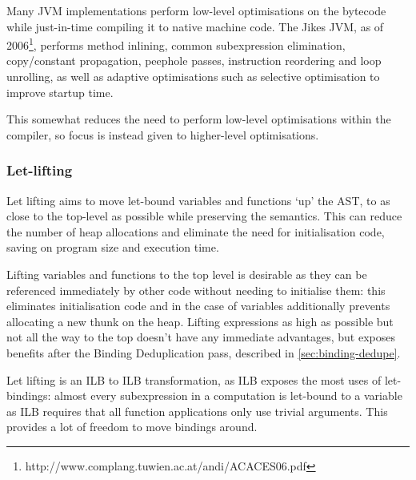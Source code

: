 \documentclass[dissertation.tex]{subfiles}
\begin{document}
{{        Many JVM implementations perform low-level optimisations on the bytecode while just-in-time compiling it to
        native machine code. The Jikes JVM, as of 2006\footnote{http://www.complang.tuwien.ac.at/andi/ACACES06.pdf},
        performs method inlining, common subexpression elimination, copy/constant propagation, peephole passes,
        instruction reordering and loop unrolling, as well as adaptive optimisations such as selective optimisation to
        improve startup time.

        This somewhat reduces the need to perform low-level optimisations within the compiler, so focus is instead given
        to higher-level optimisations.

        \subsubsection{Let-lifting}
        {

            Let lifting aims to move let-bound variables and functions `up' the AST, to as close to the top-level as
            possible while preserving the semantics. This can reduce the number of heap allocations and eliminate the
            need for initialisation code, saving on program size and execution time.

            
            Lifting variables and functions to the top level is desirable as they can be referenced immediately by other
            code without needing to initialise them: this eliminates initialisation code and in the case of variables
            additionally prevents allocating a new thunk on the heap. Lifting expressions as high as possible but not
            all the way to the top doesn't have any immediate advantages, but exposes benefits after the Binding
            Deduplication pass, described in \ref{sec:binding-dedupe}.

            Let lifting is an ILB to ILB transformation, as ILB exposes the most uses of let-bindings: almost every
            subexpression in a computation is let-bound to a variable as ILB requires that all function applications
            only use trivial arguments. This provides a lot of freedom to move bindings around.


}}}
\end{document}
